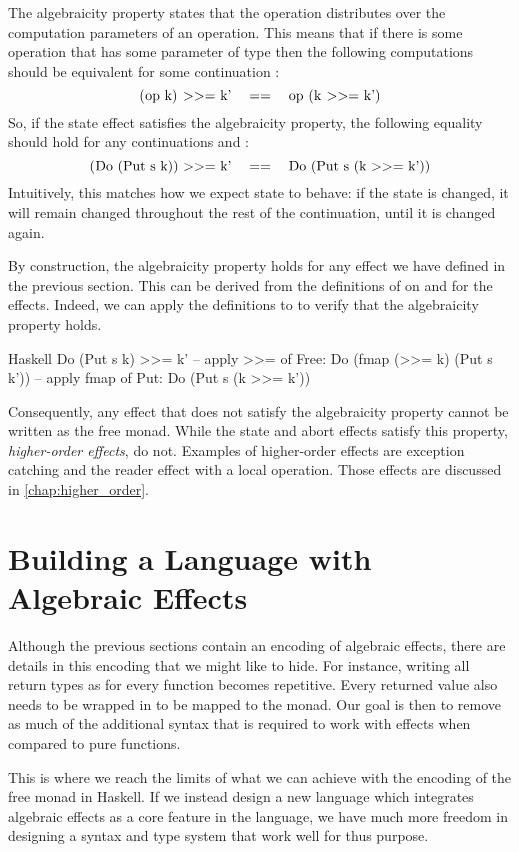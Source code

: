 The algebraicity property states that the \hs{>>=} operation distributes over the computation parameters of an operation. This means that if there is some operation  that has some parameter of type  then the following computations should be equivalent for some continuation :
\[ \mcode{(op k) >>= k'}\quad==\quad\mcode{op (k >>= k')} \]
So, if the state effect satisfies the algebraicity property, the following equality should hold for any continuations  and :
\[ \mcode{(Do (Put s k)) >>= k'}\quad==\quad\mcode{Do (Put s (k >>= k'))} \]
Intuitively, this matches how we expect state to behave: if the state is changed, it will remain changed throughout the rest of the continuation, until it is changed again.

By construction, the algebraicity property holds for any effect we have defined in the previous section. This can be derived from the definitions of \hs{>>=} on  and  for the effects. Indeed, we can apply the definitions to  to verify that the algebraicity property holds.

\begin{lst}{Haskell}
Do (Put s k) >>= k'
-- apply >>= of Free:
Do (fmap (>>= k) (Put s k'))
-- apply fmap of Put:
Do (Put s (k >>= k'))
\end{lst}
%
Consequently, any effect that does not satisfy the algebraicity property cannot be written as the free monad. While the state and abort effects satisfy this property, \emph{higher-order effects}, do not. Examples of higher-order effects are exception catching and the reader effect with a local operation. Those effects are discussed in \cref{chap:higher_order}.

\section{Building a Language with Algebraic Effects}

Although the previous sections contain an encoding of algebraic effects, there are details in this encoding that we might like to hide. For instance, writing all return types as  for every function becomes repetitive. Every returned value also needs to be wrapped in  to be mapped to the monad. Our goal is then to remove as much of the additional syntax that is required to work with effects when compared to pure functions.

This is where we reach the limits of what we can achieve with the encoding of the free monad in Haskell. If we instead design a new language which integrates algebraic effects as a core feature in the language, we have much more freedom in designing a syntax and type system that work well for thus purpose.

